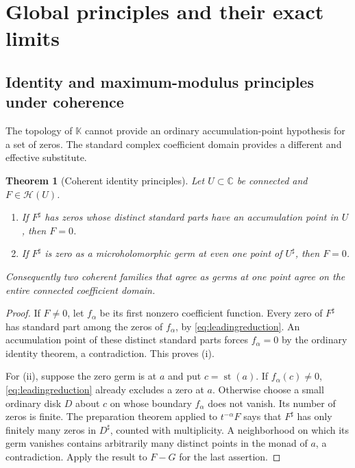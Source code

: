 \documentclass[11pt,letterpaper]{article}
\numberwithin{equation}{section}
\newtheorem{theorem}{Theorem}[section]
\theoremstyle{definition}
\theoremstyle{remark}
\newcommand{\K}{\mathbb K}
\newcommand{\C}{\mathbb C}
\newcommand{\HH}{\mathscr H}
\DeclareMathOperator{\st}{st}
\begin{document}
\section{Global principles and their exact limits}
\label{sec:globalprinciples}

\subsection{Identity and maximum-modulus principles under coherence}

The topology of $\K$ cannot provide an ordinary accumulation-point
hypothesis for a set of zeros. The standard complex coefficient domain
provides a different and effective substitute.

\begin{theorem}[Coherent identity principles]\label{thm:identity}
Let $U\subset\C$ be connected and $F\in\HH(U)$.
\begin{enumerate}[label=(\roman*)]
\item If $F^\sharp$ has zeros whose distinct standard parts have an
accumulation point in $U$, then $F=0$.
\item If $F^\sharp$ is zero as a microholomorphic germ at even one point
of $U^\sharp$, then $F=0$.
\end{enumerate}
Consequently two coherent families that agree as germs at one point
agree on the entire connected coefficient domain.
\end{theorem}
\begin{proof}
If $F\ne0$, let $f_\alpha$ be its first nonzero coefficient function.
Every zero of $F^\sharp$ has standard part among the zeros of
$f_\alpha$, by \eqref{eq:leadingreduction}. An accumulation point of
these distinct standard parts forces $f_\alpha=0$ by the ordinary
identity theorem, a contradiction. This proves (i).

For (ii), suppose the zero germ is at $a$ and put $c=\st(a)$.
If $f_\alpha(c)\ne0$, \eqref{eq:leadingreduction} already excludes a
zero at $a$. Otherwise choose a small ordinary disk $D$ about $c$ on
whose boundary $f_\alpha$ does not vanish. Its number of zeros is finite.
The preparation theorem applied to $t^{-\alpha}F$ says that $F^\sharp$
has only finitely many zeros in $D^\sharp$, counted with multiplicity.
A neighborhood on which its germ vanishes contains arbitrarily many
distinct points in the monad of $a$, a contradiction. Apply the result
to $F-G$ for the last assertion.
\end{proof}
\end{document}
